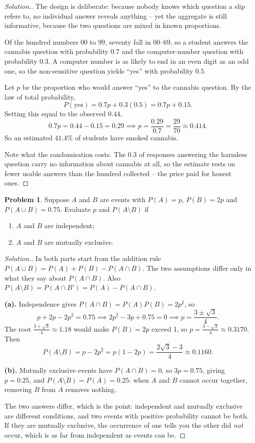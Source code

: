 \documentclass[12pt,a4paper]{report}
\theoremstyle{definition}
\theoremstyle{plain}
\theoremstyle{definition}
\newtheorem{problemx}{Problem}[section]
\newenvironment{problem}{\begin{problemx}}{\end{problemx}}
\newenvironment{solution}
  {\renewcommand{\qedsymbol}{}\begin{proof}[\textit{Solution}.]}
  {\end{proof}}
\begin{document}
\begin{solution}
The design is deliberate: because nobody knows which question a slip refers to, no
individual answer reveals anything -- yet the aggregate is still informative, because the
two questions are mixed in known proportions.

Of the hundred numbers $00$ to $99$, seventy fall in $00$--$69$, so a student answers the
cannabis question with probability $0.7$ and the computer-number question with probability
$0.3$. A computer number is as likely to end in an even digit as an odd one, so the
non-sensitive question yields ``yes'' with probability $0.5$.

Let $p$ be the proportion who would answer ``yes'' to the cannabis question. By the law of
total probability,
\[P(\text{yes}) = 0.7p + 0.3(0.5) = 0.7p + 0.15.\]
Setting this equal to the observed $0.44$,
\[0.7p = 0.44-0.15 = 0.29 \implies p = \frac{0.29}{0.7} = \frac{29}{70} \approx 0.414.\]
So an estimated $41.4\%$ of students have smoked cannabis.

Note what the randomisation costs. The $0.3$ of responses answering the harmless question
carry no information about cannabis at all, so the estimate rests on fewer usable answers
than the hundred collected -- the price paid for honest ones.
\end{solution}

\begin{problem}
Suppose $A$ and $B$ are events with $P(A) = p$, $P(B) = 2p$ and $P(A\cup B) = 0.75$.
Evaluate $p$ and $P(A\setminus B)$ if
\begin{enumerate}
\item[(a).] $A$ and $B$ are independent;
\item[(b).] $A$ and $B$ are mutually exclusive.
\end{enumerate}
\end{problem}

\begin{solution}
In both parts start from the addition rule $P(A\cup B) = P(A)+P(B)-P(A\cap B)$. The two
assumptions differ only in what they say about $P(A\cap B)$. Also
$P(A\setminus B) = P(A\cap B') = P(A)-P(A\cap B)$.

\textbf{(a).} Independence gives $P(A\cap B) = P(A)P(B) = 2p^{2}$, so
\[p+2p-2p^{2} = 0.75 \implies 2p^{2}-3p+0.75 = 0 \implies p = \frac{3\pm\sqrt{3}}{4}.\]
The root $\frac{3+\sqrt3}{4}\approx 1.18$ would make $P(B) = 2p$ exceed 1, so
$p = \frac{3-\sqrt3}{4}\approx 0.3170$. Then
\[P(A\setminus B) = p-2p^{2} = p(1-2p) = \frac{2\sqrt3-3}{4}\approx 0.1160.\]

\textbf{(b).} Mutually exclusive events have $P(A\cap B) = 0$, so $3p = 0.75$, giving
$p = 0.25$, and $P(A\setminus B) = P(A) = 0.25$: when $A$ and $B$ cannot occur together,
removing $B$ from $A$ removes nothing.

The two answers differ, which is the point: independent and mutually exclusive are
different conditions, and two events with positive probability cannot be both. If they are
mutually exclusive, the occurrence of one tells you the other did \emph{not} occur, which
is as far from independent as events can be.
\end{solution}
\end{document}
